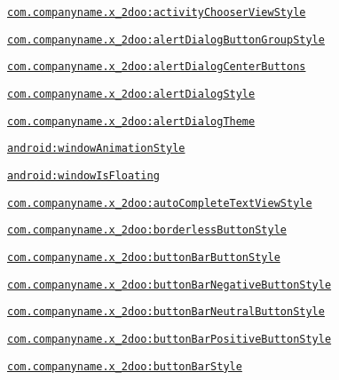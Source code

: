 {\tt \hyperlink{classandroid_1_1support_1_1v4_1_1_r_1_1styleable_69fd4d038df58587b69f6986d49ed8c1}{com.companyname.x\_\-2doo:activityChooserViewStyle}}

{\tt \hyperlink{classandroid_1_1support_1_1v4_1_1_r_1_1styleable_00941c54362f2db3092824ceb3be22dd}{com.companyname.x\_\-2doo:alertDialogButtonGroupStyle}}

{\tt \hyperlink{classandroid_1_1support_1_1v4_1_1_r_1_1styleable_8ec720cdfc46d6cc33d23d0459197671}{com.companyname.x\_\-2doo:alertDialogCenterButtons}}

{\tt \hyperlink{classandroid_1_1support_1_1v4_1_1_r_1_1styleable_41bab9fb72c63ddb10915533169e3216}{com.companyname.x\_\-2doo:alertDialogStyle}}

{\tt \hyperlink{classandroid_1_1support_1_1v4_1_1_r_1_1styleable_58e5759eace5641f42a4605d7670b7da}{com.companyname.x\_\-2doo:alertDialogTheme}}

{\tt \hyperlink{classandroid_1_1support_1_1v4_1_1_r_1_1styleable_1d77731fad30decfb99a3a8e55c35700}{android:windowAnimationStyle}}

{\tt \hyperlink{classandroid_1_1support_1_1v4_1_1_r_1_1styleable_9692aa9adae84384d1c4a70481a486a6}{android:windowIsFloating}}

{\tt \hyperlink{classandroid_1_1support_1_1v4_1_1_r_1_1styleable_8915799c22e82c51ca50dd1d9ff5b50c}{com.companyname.x\_\-2doo:autoCompleteTextViewStyle}}

{\tt \hyperlink{classandroid_1_1support_1_1v4_1_1_r_1_1styleable_53709ea62e0ea08225a291fefc09a1b5}{com.companyname.x\_\-2doo:borderlessButtonStyle}}

{\tt \hyperlink{classandroid_1_1support_1_1v4_1_1_r_1_1styleable_5392994a38004dcbc49775cdd089d6e9}{com.companyname.x\_\-2doo:buttonBarButtonStyle}}

{\tt \hyperlink{classandroid_1_1support_1_1v4_1_1_r_1_1styleable_4a4d3c9d83cb64f07235f8be079992a4}{com.companyname.x\_\-2doo:buttonBarNegativeButtonStyle}}

{\tt \hyperlink{classandroid_1_1support_1_1v4_1_1_r_1_1styleable_2e6df35632dfd48914323050d05c0a30}{com.companyname.x\_\-2doo:buttonBarNeutralButtonStyle}}

{\tt \hyperlink{classandroid_1_1support_1_1v4_1_1_r_1_1styleable_794f00fd624776c9f0e4eac6e0dd1165}{com.companyname.x\_\-2doo:buttonBarPositiveButtonStyle}}

{\tt \hyperlink{classandroid_1_1support_1_1v4_1_1_r_1_1styleable_f62e556ecad9de84a7a256eb8b485488}{com.companyname.x\_\-2doo:buttonBarStyle}}


